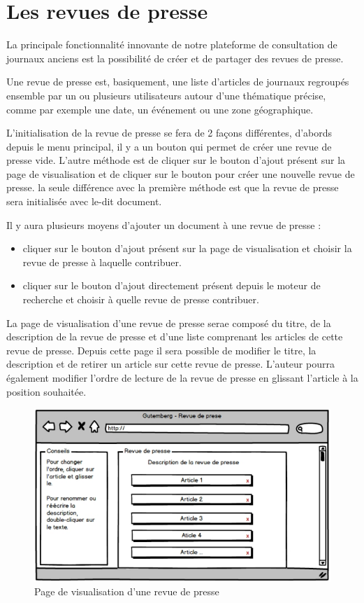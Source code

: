 \section{Les revues de presse}
\label{sec:revue}

La principale fonctionnalité innovante de notre plateforme de consultation de journaux anciens est la possibilité de
créer et de partager des revues de presse.

Une revue de presse est, basiquement, une liste d'articles de journaux regroupés ensemble par un ou plusieurs utilisateurs autour d'une thématique précise,
comme par exemple une date, un événement ou une zone géographique.

L'initialisation de la revue de presse se fera de 2 façons différentes, d'abords depuis le menu principal, il y a un bouton qui permet de créer
une revue de presse vide. L'autre méthode est de cliquer sur le bouton d'ajout présent sur la page de visualisation et de cliquer
sur le bouton pour créer une nouvelle revue de presse.
la seule différence avec la première méthode est que la revue de presse sera initialisée avec le-dit document.

Il y aura plusieurs moyens d'ajouter un document à une revue de presse :

\begin{itemize}
  \item cliquer sur le bouton d'ajout présent sur la page de visualisation et choisir la
revue de presse à laquelle contribuer.
  \item cliquer sur le bouton d'ajout directement présent depuis le moteur de recherche et choisir
à quelle revue de presse contribuer.
  \end{itemize}

La page de visualisation d'une revue de presse serae composé du titre, de la description de la revue de presse et d'une liste comprenant les articles
de cette revue de presse. Depuis cette page il sera possible de modifier le titre, la description et de retirer un article sur cette revue de presse.
L'auteur pourra également modifier l'ordre de lecture de la revue de presse en glissant l'article à la position souhaitée.

\begin{figure}[H]
    \centering
    \includegraphics[width=\textwidth]{figures/revue.png}
    \caption{Page de visualisation d'une revue de presse}
    \label{fig:revue}
\end{figure}

